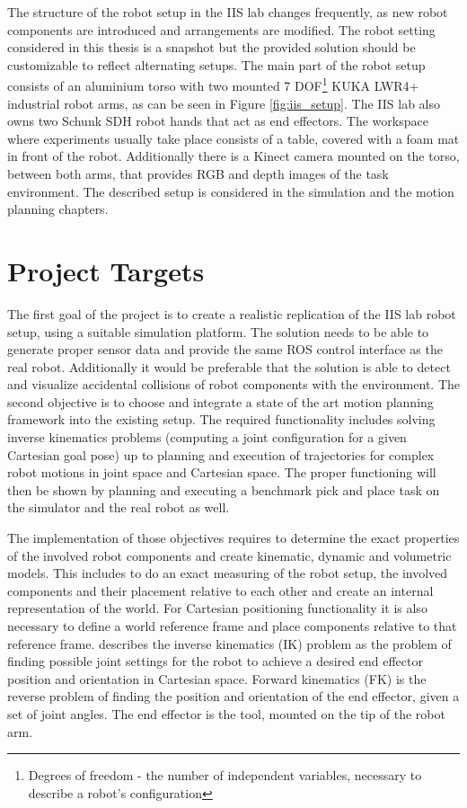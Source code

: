 The structure of the robot setup in the IIS lab changes frequently, as new robot components are introduced and arrangements are modified. The robot setting considered in this thesis is a snapshot but the provided solution should be customizable to reflect alternating setups. The main part of the robot setup consists of an aluminium torso with two mounted 7 DOF\footnote{Degrees of freedom - the number of independent variables, necessary to describe a robot's configuration} KUKA LWR4+ industrial robot arms, as can be seen in Figure \ref{fig:iis_setup}. The IIS lab also owns two Schunk SDH robot hands that act as end effectors. The workspace where experiments usually take place consists of a table, covered with a foam mat in front of the robot. Additionally there is a Kinect camera mounted on the torso, between both arms, that provides RGB and depth images of the task environment. The described setup is considered in the simulation and the motion planning chapters. 

\section{Project Targets}

The first goal of the project is to create a realistic replication of the IIS lab robot setup, using a suitable simulation platform. The solution needs to be able to generate proper sensor data and provide the same ROS control interface as the real robot. Additionally it would be preferable that the solution is able to detect and visualize accidental collisions of robot components with the environment. The second objective is to choose and integrate a state of the art motion planning framework into the existing setup. The required functionality includes  solving inverse kinematics problems (computing a joint configuration for a given Cartesian goal pose) up to planning and execution of trajectories for complex robot motions in joint space and Cartesian space. The proper functioning will then be shown by planning and executing a benchmark pick and place task on the simulator and the real robot as well.

The implementation of those objectives requires to determine the exact properties of the involved robot components and create kinematic, dynamic and volumetric models. This includes to do an exact measuring of the robot setup, the involved components and their placement relative to each other and create an internal representation of the world. For Cartesian positioning functionality it is also necessary to define a world reference frame and place components relative to that reference frame. \citep{craig2005} describes the inverse kinematics (IK) problem as the problem of finding possible joint settings for the robot to achieve a desired end effector position and orientation in Cartesian space. Forward kinematics (FK) is the reverse problem of finding the position and orientation of the end effector, given a set of joint angles. The end effector is the tool, mounted on the tip of the robot arm.


